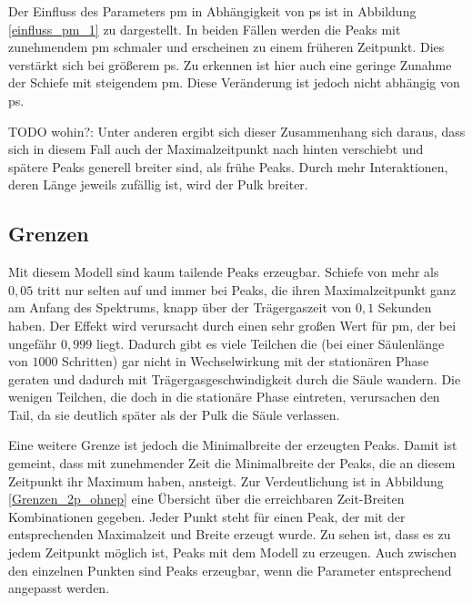 Der Einfluss des Parameters pm in Abhängigkeit von ps ist in Abbildung \ref{einfluss_pm_1} zu dargestellt. In beiden Fällen werden die Peaks mit zunehmendem pm schmaler und erscheinen zu einem früheren Zeitpunkt. Dies verstärkt sich bei größerem ps. 
Zu erkennen ist hier auch eine geringe Zunahme der Schiefe mit steigendem pm. Diese Veränderung ist jedoch nicht abhängig von ps.



TODO wohin?: Unter anderen ergibt sich dieser Zusammenhang sich daraus, dass sich in diesem Fall auch der Maximalzeitpunkt nach hinten verschiebt und spätere Peaks generell breiter sind, als frühe Peaks. Durch mehr Interaktionen, deren Länge jeweils zufällig ist, wird der Pulk breiter.



\subsection{Grenzen}
Mit diesem Modell sind kaum tailende Peaks erzeugbar. Schiefe von mehr als $0,05$ tritt nur selten auf und immer bei Peaks, die ihren Maximalzeitpunkt ganz am Anfang des Spektrums, knapp über der Trägergaszeit von $0,1$ Sekunden haben. Der Effekt wird verursacht durch einen sehr großen Wert für pm, der bei ungefähr $0,999$ liegt. Dadurch gibt es viele Teilchen die (bei einer Säulenlänge von $1000$ Schritten) gar nicht in Wechselwirkung mit der stationären Phase geraten und dadurch mit Trägergasgeschwindigkeit durch die Säule wandern. Die wenigen Teilchen, die doch in die stationäre Phase eintreten, verursachen den Tail, da sie deutlich später als der Pulk die Säule verlassen.

Eine weitere Grenze ist jedoch die Minimalbreite der erzeugten Peaks. Damit ist gemeint, dass mit zunehmender Zeit die Minimalbreite der Peaks, die an diesem Zeitpunkt ihr Maximum haben, ansteigt. Zur Verdeutlichung ist in Abbildung \ref{Grenzen_2p_ohnep} eine Übersicht über die erreichbaren Zeit-Breiten Kombinationen gegeben. Jeder Punkt steht für einen Peak, der mit der entsprechenden Maximalzeit und Breite erzeugt wurde.
Zu sehen ist, dass es zu jedem Zeitpunkt möglich ist, Peaks mit dem Modell zu erzeugen. Auch zwischen den einzelnen Punkten sind Peaks erzeugbar, wenn die Parameter entsprechend angepasst werden.

